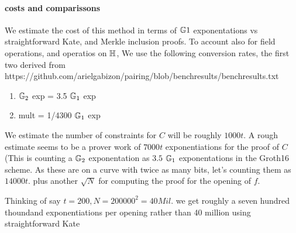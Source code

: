 \documentclass[11pt]{article}
\numberwithin{figure}{section} %
\begin{document}
 \paragraph{costs and comparissons}
 We estimate the cost of this method in terms of ${\mathbb G}1$ exponentations vs straightforward Kate, and Merkle inclusion proofs.
 To account also for field operations, and operatios on ${\mathbb H}$,
 We use the following conversion rates, the first two derived from https://github.com/arielgabizon/pairing/blob/benchresults/benchresults.txt
 \begin{enumerate}
  \item ${\mathbb G}_2$ exp = 3.5 ${\mathbb G}_1$ exp
  \item \Fr mult = 1/4300 ${\mathbb G}_1$ exp
 \end{enumerate}

 
 
 
 We estimate the number of constraints for $C$ will be roughly $1000t$.
 A rough estimate seems to be a prover work of $7000t$ exponentiations for the proof of $C$ (This is counting a ${\mathbb G}_2$ exponentation as $3.5$ ${\mathbb G}_1$ exponentations in the Groth16 scheme. 
 As these are on a curve with twice as many bits, let's counting them as $14000t$.
 plus another $\sqrt{N}$ for computing the proof for the opening of $f$.
 
 Thinking of say $t=200, N=200000^2 =40 Mil.$ we get roughly a seven hundred thoundand exponentiations  per opening rather than 40 million using straightforward Kate
 
 \renewcommand{\F}{\ensuremath{{\mathbb F}}\xspace}
\end{document}
